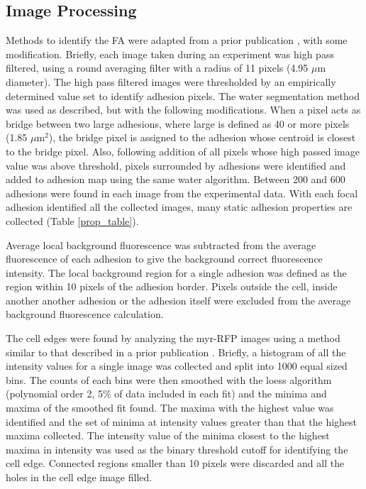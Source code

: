 \documentclass[10pt]{article}
\begin{document}
\subsection*{Image Processing}

Methods to identify the FA were adapted from a prior publication
\cite{Zamir1999}, with some modification. Briefly, each image taken during an
experiment was high pass filtered, using a round averaging filter with a radius
of 11 pixels (4.95 $\mu$m diameter). The high pass filtered images were
thresholded by an empirically determined value set to identify adhesion pixels.
The water segmentation method was used as described, but with the following
modifications. When a pixel acts as bridge between two large adhesions, where
large is defined as 40 or more pixels (1.85 $\mu$m$^2$), the bridge pixel is
assigned to the adhesion whose centroid is closest to the bridge pixel. Also,
following addition of all pixels whose high passed image value was above
threshold, pixels surrounded by adhesions were identified and added to adhesion
map using the same water algorithm. Between 200 and 600 adhesions were found in
each image from the experimental data. With each focal adhesion identified all
the collected images, many static adhesion properties are collected (Table
\ref{prop_table}).

Average local background fluorescence was subtracted from the average
fluorescence of each adhesion to give the background correct fluorescence
intensity. The local background region for a single adhesion was defined as the
region within 10 pixels of the adhesion border. Pixels outside the cell, inside
another another adhesion or the adhesion itself were excluded from the average
background fluorescence calculation.

The cell edges were found by analyzing the myr-RFP images using a method similar
to that described in a prior publication \cite{Machacek06}. Briefly, a histogram
of all the intensity values for a single image was collected and split into 1000
equal sized bins. The counts of each bins were then smoothed with the loess
algorithm \cite{Cleveland79} (polynomial order 2, 5\% of data included in each
fit) and the minima and maxima of the smoothed fit found. The maxima with the
highest value was identified and the set of minima at intensity values greater
than that the highest maxima collected. The intensity value of the minima
closest to the highest maxima in intensity was used as the binary threshold
cutoff for identifying the cell edge. Connected regions smaller than 10 pixels
were discarded and all the holes in the cell edge image filled.
\end{document}
